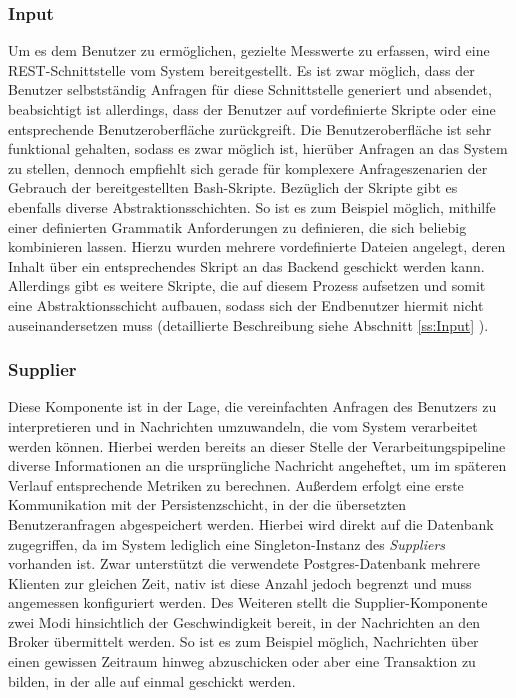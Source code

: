 \subsubsection{Input}
Um es dem Benutzer zu ermöglichen, gezielte Messwerte zu erfassen, wird eine REST-Schnittstelle vom System bereitgestellt. Es ist zwar möglich, dass der Benutzer selbstständig Anfragen für diese Schnittstelle generiert und absendet, beabsichtigt ist allerdings, dass der Benutzer auf vordefinierte Skripte oder eine entsprechende Benutzeroberfläche zurückgreift. Die Benutzeroberfläche ist sehr funktional gehalten, sodass es zwar möglich ist, hierüber Anfragen an das System zu stellen, dennoch empfiehlt sich gerade für komplexere Anfrageszenarien der Gebrauch der bereitgestellten Bash-Skripte. Bezüglich der Skripte gibt es ebenfalls diverse Abstraktionsschichten. So ist es zum Beispiel möglich, mithilfe einer definierten Grammatik Anforderungen zu definieren, die sich beliebig kombinieren lassen. Hierzu wurden mehrere vordefinierte Dateien angelegt, deren Inhalt über ein entsprechendes Skript an das Backend geschickt werden kann. Allerdings gibt es weitere Skripte, die auf diesem Prozess aufsetzen und somit eine Abstraktionsschicht aufbauen, sodass sich der Endbenutzer hiermit nicht auseinandersetzen muss (detaillierte Beschreibung siehe Abschnitt \ref{ss:Input} ).

\subsubsection{Supplier}
Diese Komponente ist in der Lage, die vereinfachten Anfragen des Benutzers zu interpretieren und in Nachrichten umzuwandeln, die vom System verarbeitet werden können. Hierbei werden bereits an dieser Stelle der Verarbeitungspipeline diverse Informationen an die ursprüngliche Nachricht angeheftet, um im späteren Verlauf entsprechende Metriken zu berechnen. Außerdem erfolgt eine erste Kommunikation mit der Persistenzschicht, in der die übersetzten Benutzeranfragen abgespeichert werden. Hierbei wird direkt auf die Datenbank zugegriffen, da im System lediglich eine Singleton-Instanz des \emph{Suppliers} vorhanden ist. Zwar unterstützt die verwendete Postgres-Datenbank mehrere Klienten zur gleichen Zeit, nativ ist diese Anzahl jedoch begrenzt und muss angemessen konfiguriert werden. Des Weiteren stellt die Supplier-Komponente zwei Modi hinsichtlich der Geschwindigkeit bereit, in der Nachrichten an den Broker übermittelt werden. So ist es zum Beispiel möglich, Nachrichten über einen gewissen Zeitraum hinweg abzuschicken oder aber eine Transaktion zu bilden, in der alle auf einmal geschickt werden.

